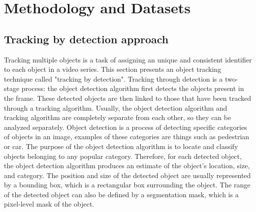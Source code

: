 \chapter{Methodology and Datasets}\label{chap:method}
\section{Tracking by detection approach}
Tracking multiple objects is a task of assigning an unique and consistent identifier to each object in a video series. This section presents an object tracking technique called "tracking by detection". Tracking through detection is a two-stage process: the object detection algorithm first detects the objects present in the frame. These detected objects are then linked to those that have been tracked through a tracking algorithm. Usually, the object detection algorithm and tracking algorithm are completely separate from each other, so they can be analyzed separately.
Object detection is a process of detecting specific categories of objects in an image, examples of these categories are things such as pedestrian or car. The purpose of the object detection algorithm is to locate and classify objects belonging to any popular category. Therefore, for each detected object, the object detection algorithm produces an estimate of the object's location, size, and category. The position and size of the detected object are usually represented by a bounding box, which is a rectangular box surrounding the object. The range of the detected object can also be defined by a segmentation mask, which is a pixel-level mask of the object.
